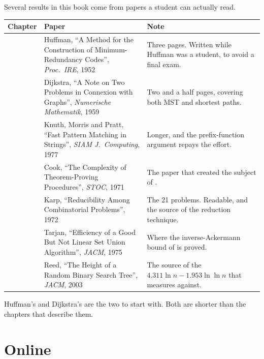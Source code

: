 \begin{conceptbox}
Several results in this book come from papers a student can actually read.

\begin{longtable}{@{}L{3.0cm}L{6.0cm}L{5.3cm}@{}}
\toprule
{}
\textbf{Chapter} & \textbf{Paper} & \textbf{Note} \\
\midrule
\endhead
{} & Huffman, ``A Method for the Construction of
  Minimum-Redundancy Codes'', \emph{Proc.\ IRE}, 1952 &
  Three pages. Written while Huffman was a student, to avoid a final exam. \\
 & Dijkstra, ``A Note on Two Problems in Connexion with
  Graphs'', \emph{Numerische Mathematik}, 1959 &
  Two and a half pages, covering both MST and shortest paths. \\
 & Knuth, Morris and Pratt, ``Fast Pattern Matching in
  Strings'', \emph{SIAM J.\ Computing}, 1977 &
  Longer, and the prefix-function argument repays the effort. \\
 & Cook, ``The Complexity of Theorem-Proving Procedures'',
  \emph{STOC}, 1971 &
  The paper that created the subject of . \\
 & Karp, ``Reducibility Among Combinatorial Problems'', 1972 &
  The 21 problems. Readable, and the source of the reduction technique. \\
 & Tarjan, ``Efficiency of a Good But Not Linear Set Union
  Algorithm'', \emph{JACM}, 1975 &
  Where the inverse-Ackermann bound of  is proved. \\
 & Reed, ``The Height of a Random Binary Search Tree'',
  \emph{JACM}, 2003 &
  The source of the $4.311\ln n - 1.953\ln\ln n$ that 
  measures against. \\
\bottomrule
\end{longtable}

\smallskip
Huffman's and Dijkstra's are the two to start with. Both are shorter than the
chapters that describe them.
\end{conceptbox}

\section{Online}

